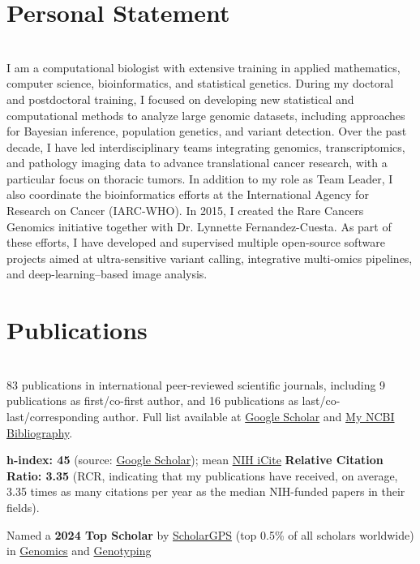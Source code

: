 \documentclass[10pt,a4paper]{article}
\begin{document}
\section{Personal Statement}
\ \\
I am a computational biologist with extensive training in applied mathematics, computer science,
bioinformatics, and statistical genetics. During my doctoral and postdoctoral training, I focused on
developing new statistical and computational methods to analyze large genomic datasets, including
approaches for Bayesian inference, population genetics, and variant detection. Over the past decade, I
have led interdisciplinary teams integrating genomics, transcriptomics, and pathology imaging data to
advance translational cancer research, with a particular focus on thoracic tumors. In addition to my role as Team Leader, I also coordinate the
bioinformatics efforts at the International Agency for Research on Cancer (IARC-WHO). In 2015, I created the Rare Cancers Genomics initiative
together with Dr. Lynnette Fernandez-Cuesta. As part of these efforts, I have developed and supervised
multiple open-source software projects aimed at ultra-sensitive variant calling, integrative multi-omics
pipelines, and deep-learning–based image analysis.

\section{Publications}
\ \\
83 publications in international peer-reviewed scientific journals, including 9 publications as first/co-first author, and 16 publications as last/co-last/corresponding author. Full list available at \href{https://scholar.google.com/citations?hl=en&user=vzZPQj8AAAAJ&view_op=list_works&sortby=pubdate}{Google Scholar} and  \href{https://www.ncbi.nlm.nih.gov/myncbi/matthieu.foll.1/bibliography/public/}{My NCBI Bibliography}.

\textbf{h-index: 45} (source: \href{https://scholar.google.com/citations?hl=en&user=vzZPQj8AAAAJ&view_op=list_works&sortby=pubdate}{Google Scholar}); mean \href{https://icite.od.nih.gov/results?search_id=s2kwpwnywv4qgg4r#}{NIH iCite} \textbf{Relative Citation Ratio: 3.35} (RCR, indicating that my publications have received, on average, 3.35 times as many citations per year as the median NIH-funded papers in their fields).

Named a \textbf{2024 Top Scholar} by \href{https://scholargps.com/scholars/36665698545984/matthieu-foll}{ScholarGPS} (top 0.5\% of all scholars worldwide) in \href{https://scholargps.com/top-scholars?year=2024&ranking_duration=LIFETIME&specialty=Genomics&p=82&e_ref=be75210910e03c3129a7#1631}{Genomics} and \href{https://scholargps.com/top-scholars?year=2024&ranking_duration=LIFETIME&specialty=Genotyping&p=12&e_ref=be75210910e03c3129a7#236}{Genotyping}
\end{document}
